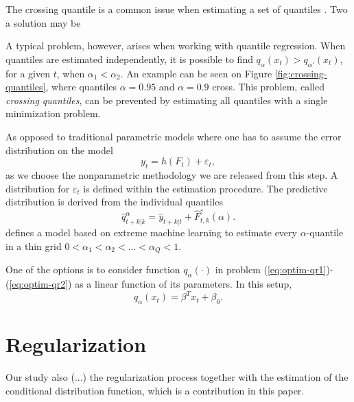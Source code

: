The crossing quantile is a common issue when estimating a set of quantiles \cite{chernozhukov_quantile_2010}. Two a solution may be 


A typical problem, however, arises when working with quantile regression. When quantiles are estimated independently, it is possible to find $q_{\alpha}(x_t) > q_{\alpha'}(x_t)$, for a given $t$, when $\alpha_1 < \alpha_2$. An example can be seen on Figure \ref{fig:crossing-quantiles}, where quantiles $\alpha = 0.95$ and $\alpha = 0.9$ cross. This problem, called \textit{crossing quantiles}, can be prevented by estimating all quantiles with a single minimization problem.



As opposed to traditional parametric models where one has to assume the error distribution on the model
\begin{equation}
y_t = h(F_t) + \varepsilon_t,
\end{equation}
as we choose the nonparametric methodology we are released from this step. A distribution for $\varepsilon_t$ is defined within the estimation procedure. The predictive distribution is derived from the individual quantiles
\begin{equation}
\hat q^\alpha_{t+k|k} = \hat y_{t+k|t} + \hat F^\varepsilon_{t,k}(\alpha).
\end{equation}
\cite{wan_direct_2017} defines a model based on extreme machine learning to estimate every $\alpha$-quantile in a thin grid $0 < \alpha_1 < \alpha_2 < \dots < \alpha_Q < 1$. 
	
	
	
	
	
	

One of the options is to consider function $q_\alpha(\cdot)$ in problem (\ref{eq:optim-qr1})-(\ref{eq:optim-qr2}) as a linear function of its parameters. In this setup, 
\begin{equation}
\hat q_\alpha(x_t) = \beta^T x_t + \beta_0.
\end{equation}

\section{Regularization}
Our study also (...) the regularization process together with the estimation of the conditional distribution function, which is a contribution in this paper.


